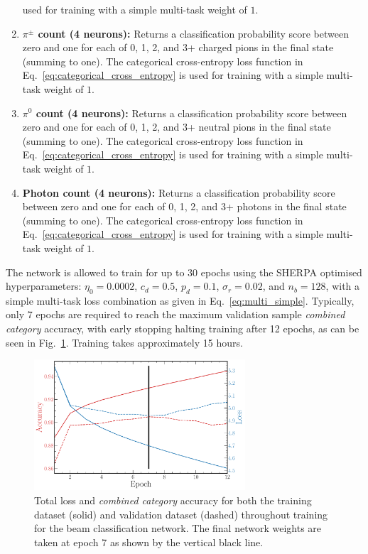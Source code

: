 \begin{enumerate}
          used for training with a simple multi-task weight of $1$.
    \item \textbf{$\pi^{\pm}$ count (4 neurons):} Returns a classification probability score
          between zero and one for each of 0, 1, 2, and 3+ charged pions in the final state
          (summing to one). The categorical cross-entropy loss function in
          Eq.~\ref{eq:categorical_cross_entropy} is used for training with a simple multi-task
          weight of $1$.
    \item \textbf{$\pi^{0}$ count (4 neurons):} Returns a classification probability score between
          zero and one for each of 0, 1, 2, and 3+ neutral pions in the final state (summing to
          one). The categorical cross-entropy loss function in
          Eq.~\ref{eq:categorical_cross_entropy} is used for training with a simple multi-task
          weight of $1$.
    \item \textbf{Photon count (4 neurons):} Returns a classification probability score between
          zero and one for each of 0, 1, 2, and 3+ photons in the final state (summing to one).
          The categorical cross-entropy loss function in Eq.~\ref{eq:categorical_cross_entropy} is
          used for training with a simple multi-task weight of $1$.
\end{enumerate}

The network is allowed to train for up to 30 epochs using the SHERPA optimised hyperparameters:
$\eta_{0}=0.0002$, $c_{d}=0.5$, $p_{d}=0.1$, $\sigma_{r}=0.02$, and $n_{b}=128$, with a simple
multi-task loss combination as given in Eq.~\ref{eq:multi_simple}. Typically, only 7 epochs are
required to reach the maximum validation sample \emph{combined category} accuracy, with early
stopping halting training after 12 epochs, as can be seen in Fig.~\ref{fig:final_beam_history}.
Training takes approximately 15 hours.

\begin{figure} %
    \includegraphics[width=0.7\textwidth]{diagrams/7-results/final_beam_history.pdf}
    \caption[Loss and accuracy throughout training for the beam classification network]
    {Total loss and \emph{combined category} accuracy for both the training dataset (solid) and
        validation dataset (dashed) throughout training for the beam classification network. The
        final network weights are taken at epoch 7 as shown by the vertical black line.}
    \label{fig:final_beam_history}
\end{figure}

